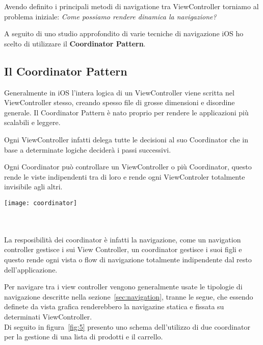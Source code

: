 Avendo definito i principali metodi di navigatione tra ViewController torniamo al problema iniziale:
\textit{Come possiamo rendere dinamica la navigazione?}

A seguito di uno studio approfondito di varie tecniche di navigazione iOS ho scelto di utilizzare il
\textbf{Coordinator Pattern}\cite{coordinatorpattern}.

\subsection{Il Coordinator Pattern}

Generalmente in iOS l'intera logica di un ViewController viene scritta nel ViewController stesso, creando spesso
file di grosse dimensioni e disordine generale. Il Coordinator Pattern è nato proprio per rendere 
le applicazioni più scalabili e leggere. 

Ogni ViewController infatti delega tutte le decisioni al suo Coordinator che in base a determinate logiche deciderà
i passi successivi.

Ogni Coordinator può controllare un ViewController o più Coordinator, questo rende le viste
indipendenti tra di loro e rende ogni ViewControler totalmente invisibile agli altri.\\

\begin{minipage}{\linewidth}
    \centering
    \texttt{[image: coordinator]}
    \label{fig:4}
\end{minipage}\\ \\

La resposibilità dei coordinator è infatti la navigazione, come un navigation controller gestisce i sui View Controller, un coordinator gestisce
i suoi figli e questo rende ogni vista o flow di navigazione totalmente indipendente dal resto dell'applicazione.

Per navigare tra i view controller vengono generalmente usate le tipologie di navigazione
descritte nella sezione~\ref{sec:navigation}, tranne le segue, che essendo definete da vista grafica renderebbero
la navigazine statica e fissata su determinati ViewController. \\


Di seguito in figura~\ref{fig:5} presento uno schema dell'utilizzo di due coordinator
per la gestione di una lista di prodotti e il carrello. \\

